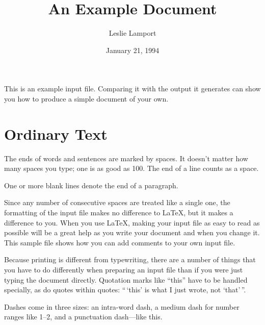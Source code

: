 \documentclass{article}      %
\title{An Example Document}  %
\author{Leslie Lamport}      %
\date{January 21, 1994}      %
\begin{document}

\maketitle                   %

This is an example input file.  Comparing it with
the output it generates can show you how to
produce a simple document of your own.

\section{Ordinary Text}      %

The ends  of words and sentences are marked 
  by   spaces. It  doesn't matter how many 
spaces    you type; one is as good as 100.  The
end of   a line counts as a space.

One   or more   blank lines denote the  end 
of  a paragraph.  

Since any number of consecutive spaces are treated
like a single one, the formatting of the input
file makes no difference to
      \LaTeX,                %
but it makes a difference to you.  When you use
\LaTeX, making your input file as easy to read 
as possible will be a great help as you write 
your document and when you change it.  This sample 
file shows how you can add comments to your own input 
file.

Because printing is different from typewriting,
there are a number of things that you have to do
differently when preparing an input file than if
you were just typing the document directly.
Quotation marks like
       ``this'' 
have to be handled specially, as do quotes within
quotes:
       ``\,`this'            %
        is what I just 
        wrote, not  `that'\,''.  

Dashes come in three sizes: an 
       intra-word 
dash, a medium dash for number ranges like 
       1--2, 
and a punctuation 
       dash---like 
this.
\end{document}
